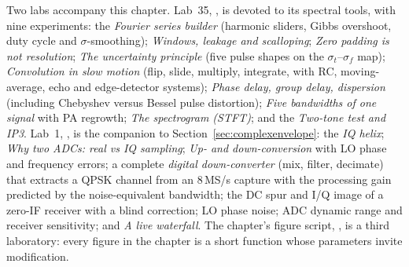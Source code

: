 \begin{labbox}
Two labs accompany this chapter. Lab~35, , is
devoted to its spectral tools, with nine experiments: the \emph{Fourier series builder} (harmonic
sliders, Gibbs overshoot, duty cycle and $\sigma$-smoothing); \emph{Windows, leakage and scalloping};
\emph{Zero padding is not resolution}; \emph{The uncertainty principle} (five pulse shapes on the
$\sigma_t$--$\sigma_f$ map); \emph{Convolution in slow motion} (flip, slide, multiply, integrate,
with RC, moving-average, echo and edge-detector systems); \emph{Phase delay, group delay, dispersion}
(including Chebyshev versus Bessel pulse distortion); \emph{Five bandwidths of one signal} with PA
regrowth; \emph{The spectrogram (STFT)}; and the \emph{Two-tone test and IP3}.
Lab~1, , is the companion to
Section~\ref{sec:complexenvelope}: the \emph{IQ helix}; \emph{Why two ADCs: real vs IQ sampling};
\emph{Up- and down-conversion} with LO phase and frequency errors; a complete \emph{digital
down-converter} (mix, filter, decimate) that extracts a QPSK channel from an 8\,MS/s capture with the
processing gain predicted by the noise-equivalent bandwidth; the DC spur and I/Q image of a
zero-IF receiver with a blind correction; LO phase noise; ADC dynamic range and receiver sensitivity;
and \emph{A live waterfall}. The chapter's figure script, , is a
third laboratory: every figure in the chapter is a short function whose parameters invite
modification.
\end{labbox}

